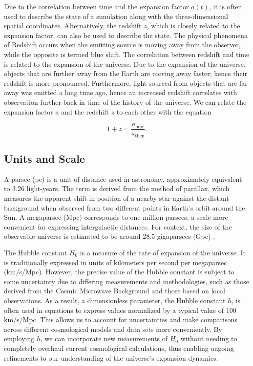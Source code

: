 \documentclass{article}
\begin{document}
Due to the correlation between time and the expansion factor \(a(t)\), it is often used to describe the state of a simulation along with the three-dimensional spatial coordinates. Alternatively, the redshift \(z\), which is closely related to the expansion factor, can also be used to describe the state. The physical phenomena of Redshift occurs when the emitting source is moving away from the observer, while the opposite is termed blue shift. The correlation between redshift and time is related to the expansion of the universe. Due to the expansion of the universe, objects that are further away from the Earth are moving away faster; hence their redshift is more pronounced. Furthermore, light sourced from objects that are far away was emitted a long time ago, hence an increased redshift correlates with observation further back in time of the history of the universe. We can relate the expansion factor \(a\) and the redshift \(z\) to each other with the equation

\begin{equation}
    \label{eq:redshift}
    1 + z = \frac{a_{\text{now}}}{a_{\text{then}}}.
\end{equation}

\subsection{Units and Scale}

A parsec (pc) is a unit of distance used in astronomy, approximately equivalent to 3.26 light-years. The term is derived from the method of parallax, which measures the apparent shift in position of a nearby star against the distant background when observed from two different points in Earth's orbit around the Sun. A megaparsec (Mpc) corresponds to one million parsecs, a scale more convenient for expressing intergalactic distances. For context, the size of the observable universe is estimated to be around 28.5 gigaparsecs (Gpc) \citep{bars2010extra}.

The Hubble constant \(H_0\) is a measure of the rate of expansion of the universe. It is traditionally expressed in units of kilometers per second per megaparsec (km/s/Mpc). However, the precise value of the Hubble constant is subject to some uncertainty due to differing measurements and methodologies, such as those derived from the Cosmic Microwave Background and those based on local observations. As a result, a dimensionless parameter, the Hubble constant \(h\), is often used in equations to express values normalized by a typical value of 100 km/s/Mpc. This allows us to account for uncertainties and make comparisons across different cosmological models and data sets more conveniently. By employing \(h\), we can incorporate new measurements of \(H_0\) without needing to completely overhaul current cosmological calculations, thus enabling ongoing refinements to our understanding of the universe's expansion dynamics.
\end{document}
